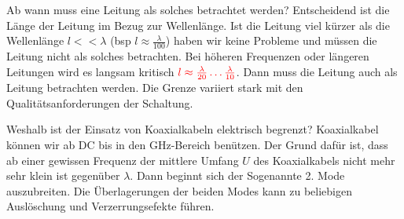\begin{karte}{Ab wann muss eine Leitung als solches betrachtet werden?}
	Entscheidend  ist die Länge der Leitung im Bezug zur Wellenlänge. Ist die Leitung viel kürzer als die Wellenlänge $l<<\lambda$ (bsp $l \approx \frac{\lambda}{100}$) haben wir keine Probleme und müssen die Leitung nicht als solches betrachten. Bei höheren Frequenzen oder längeren Leitungen wird es langsam kritisch $\color{red} l \approx \frac{\lambda}{20} \dots \frac{\lambda}{10}$. Dann muss die Leitung auch als Leitung betrachten werden. Die Grenze variiert stark mit den Qualitätsanforderungen der Schaltung.
\end{karte}

\begin{karte}{Weshalb ist der Einsatz von Koaxialkabeln elektrisch begrenzt?}
	Koaxialkabel können wir ab DC bis in den GHz-Bereich benützen. Der Grund dafür ist, dass ab einer gewissen Frequenz der mittlere Umfang $U$ des Koaxialkabels nicht mehr sehr klein ist gegenüber $\lambda$.
	Dann beginnt sich der Sogenannte 2. Mode auszubreiten. Die Überlagerungen der beiden Modes kann zu beliebigen Auslöschung und Verzerrungsefekte führen.
	
	\centering{\scalebox{.7}{}}
			
\end{karte}
